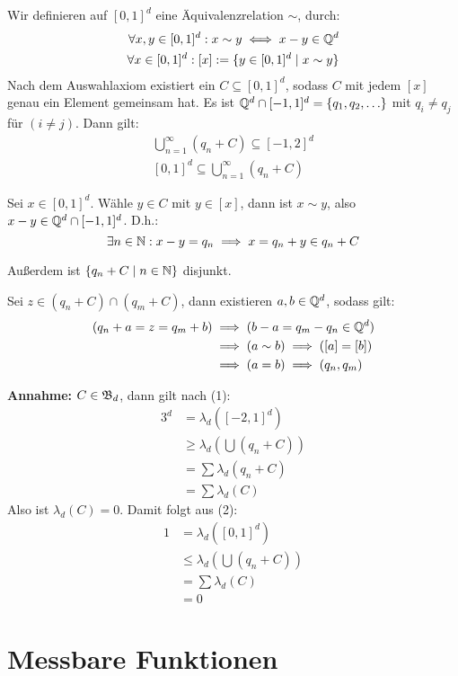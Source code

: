 \documentclass[a4paper,twoside,DIV15,BCOR12mm,chapterprefix=true,headings=onelinechapter]{scrbook}
\begin{document}
\begin{beweis}
Wir definieren auf $[0,1]^d$ eine Äquivalenzrelation $\sim$, durch:
\begin{align*}
\forall x,y\in[0,1]^d: x \sim y\iff x-y\in\mathbb{Q}^d\\
\forall x\in[0,1]^d:[x]:=\{y\in[0,1]^d\mid x\sim y\}
\end{align*}
Nach dem Auswahlaxiom existiert ein $C\subseteq[0,1]^d$, sodass $C$ mit jedem $[x]$ genau ein Element gemeinsam hat.
Es ist $\mathbb{Q}^d\cap[-1,1]^d=\{q_1,q_2,\ldots\}$ mit $q_i\ne q_j$ für $(i\ne j)$. Dann gilt:
\begin{align*}
\tag{1} \bigcup_{n=1}^\infty(q_n+C)\subseteq[-1,2]^d\\
\tag{2} [0,1]^d\subseteq\bigcup_{n=1}^\infty(q_n+C)
\end{align*}
\begin{beweis}
Sei $x\in[0,1]^d$. Wähle $y\in C$ mit $y\in[x]$, dann ist $x\sim y$, also $x-y\in\mathbb{Q}^d\cap[-1,1]^d$. D.h.:
\[\exists n\in\mathbb{N}: x-y=q_n\implies x=q_n+y\in q_n+C\] 
\end{beweis}
Außerdem ist $\{q_n+C\mid n\in\mathbb{N}\}$ disjunkt.
\begin{beweis}
Sei $z\in(q_n+C)\cap(q_m+C)$, dann existieren $a,b\in\mathbb{Q}^d$, sodass gilt:
\begin{align*}
(q_n+a=z=q_m+b) &\implies (b-a=q_m-q_n\in\mathbb{Q}^d)\\
&\implies (a\sim b) \implies([a]=[b])\\
&\implies (a=b)\implies (q_n,q_m)
\end{align*}
\end{beweis}
\textbf{Annahme:} $C\in\mathfrak{B}_d$, dann gilt nach (1):
\begin{align*}
3^d&=\lambda_d([-2,1]^d)\\
&\ge\lambda_d(\bigcup(q_n+C))\\
&=\sum \lambda_d(q_n+C)\\
&=\sum \lambda_d(C)
\end{align*}
Also ist $\lambda_d(C)=0$. Damit folgt aus (2):
\begin{align*}
1&=\lambda_d([0,1]^d)\\
&\le \lambda_d(\bigcup (q_n+C))\\
&=\sum \lambda_d(C)\\
&=0
\end{align*}
\end{beweis}

\chapter{Messbare Funktionen}
\end{document}
